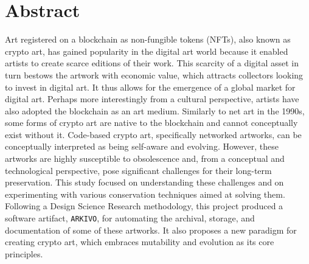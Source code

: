 \chapter*{Abstract}




Art registered on a blockchain as non-fungible tokens (NFTs), also known as crypto art, has gained popularity in the digital art world because it enabled artists to create scarce editions of their work. This scarcity of a digital asset in turn bestows the artwork with economic value, which attracts collectors looking to invest in digital art. It thus allows for the emergence of a global market for digital art. Perhaps more interestingly from a cultural perspective, artists have also adopted the blockchain as an art medium. Similarly to net art in the 1990s, some forms of crypto art are native to the blockchain and cannot conceptually exist without it. Code-based crypto art, specifically networked artworks, can be conceptually interpreted as being self-aware and evolving. However, these artworks are highly susceptible to obsolescence and, from a conceptual and technological perspective, pose significant challenges for their long-term preservation.
This study focused on understanding these challenges and on experimenting with various conservation techniques aimed at solving them. Following a Design Science Research methodology, this project produced a software artifact, \texttt{ARKIVO}, for automating the archival, storage, and documentation of some of these artworks. It also proposes a new paradigm for creating crypto art, which embraces mutability and evolution as its core principles.
